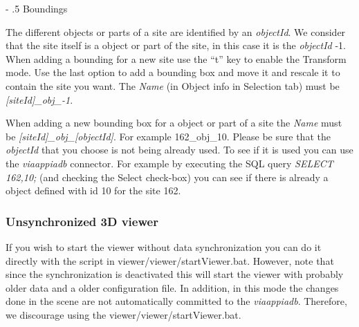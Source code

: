 \documentclass[a4paper,11pt]{article}
\makeatletter
\renewcommand\paragraph{%
   \@startsection{paragraph}{4}{0mm}%
      {-\baselineskip}%
      {.5\baselineskip}%
      {\normalfont\normalsize\bfseries}}
\makeatother
\begin{document}
\paragraph{Boundings}

The different objects or parts of a site are identified by an \textit{objectId}. We consider that the site itself is a object or part of the site, in this case it is the \textit{objectId} -1. 
When adding a bounding for a new site use the ``t'' key to enable the Transform mode. Use the last option to add a bounding box and move it and rescale it to contain the site you want. The \textit{Name} (in Object info in Selection tab) must be \textit{[siteId]\_obj\_-1}.

When adding a new bounding box for a object or part of a site the \textit{Name} must be \textit{[siteId]\_obj\_[objectId]}. For example 162\_obj\_10. Please be sure that the \textit{objectId} that you choose is not being already used. To see if it is used you can use the \textit{viaappiadb} connector. For example by executing the SQL query \textit{SELECT 162,10;} (and checking the Select check-box) you can see if there is already a object defined with id 10 for the site 162. 

\subsubsection{Unsynchronized 3D viewer}

If you wish to start the viewer without data synchronization you can do it directly with the script in viewer/viewer/startViewer.bat. However, note that since the synchronization is deactivated this will start the viewer with probably older data and a older configuration file. In addition, in this mode the changes done in the scene are not automatically committed to the \textit{viaappiadb}. Therefore, we discourage using the viewer/viewer/startViewer.bat.





\end{document}
